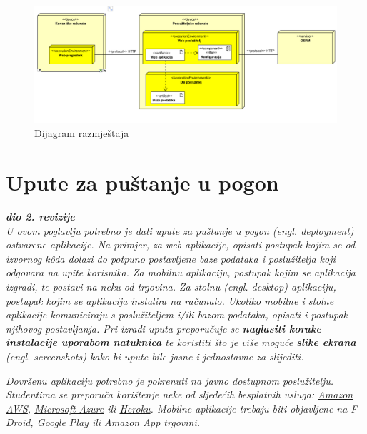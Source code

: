 \begin{figure}[H]
	\includegraphics[width=\textwidth]{slike/dijagram_razmjestaja.png} %
	\centering
	\caption{Dijagram razmještaja}
	\label{fig:dijagramaktivnosti}
\end{figure}
\eject 

\section{Upute za puštanje u pogon}

\textbf{\textit{dio 2. revizije}}\\

\textit{U ovom poglavlju potrebno je dati upute za puštanje u pogon (engl. deployment) ostvarene aplikacije. Na primjer, za web aplikacije, opisati postupak kojim se od izvornog kôda dolazi do potpuno postavljene baze podataka i poslužitelja koji odgovara na upite korisnika. Za mobilnu aplikaciju, postupak kojim se aplikacija izgradi, te postavi na neku od trgovina. Za stolnu (engl. desktop) aplikaciju, postupak kojim se aplikacija instalira na računalo. Ukoliko mobilne i stolne aplikacije komuniciraju s poslužiteljem i/ili bazom podataka, opisati i postupak njihovog postavljanja. Pri izradi uputa preporučuje se \textbf{naglasiti korake instalacije uporabom natuknica} te koristiti što je više moguće \textbf{slike ekrana} (engl. screenshots) kako bi upute bile jasne i jednostavne za slijediti.}


\textit{Dovršenu aplikaciju potrebno je pokrenuti na javno dostupnom poslužitelju. Studentima se preporuča korištenje neke od sljedećih besplatnih usluga: \href{https://aws.amazon.com/}{Amazon AWS}, \href{https://azure.microsoft.com/en-us/}{Microsoft Azure} ili \href{https://www.heroku.com/}{Heroku}. Mobilne aplikacije trebaju biti objavljene na F-Droid, Google Play ili Amazon App trgovini.}


\eject 